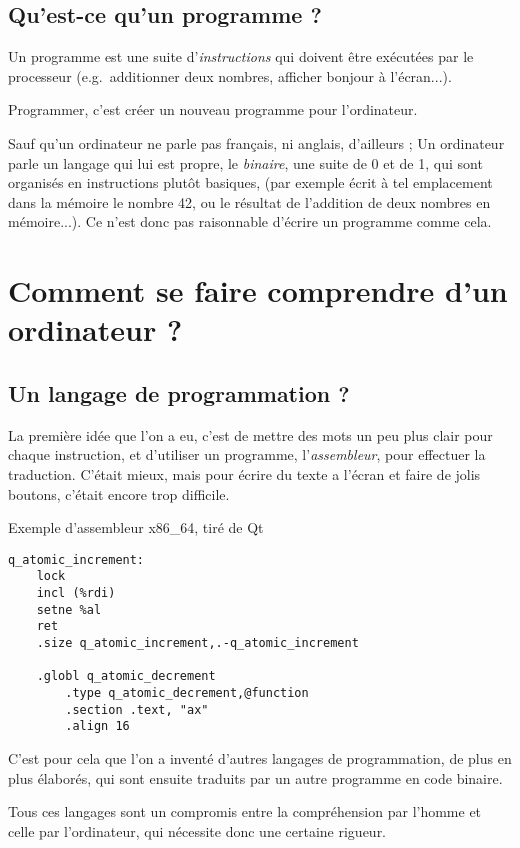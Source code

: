 \subsection{Qu'est-ce qu'un programme ?}
Un programme est une suite d'\emph{instructions} qui doivent être exécutées par le processeur
(e.g.\ additionner deux nombres, afficher bonjour à l'écran...).

Programmer, c'est créer un nouveau programme pour l'ordinateur.

Sauf qu'un ordinateur ne parle pas français, ni anglais, d'ailleurs ;
Un ordinateur parle un langage qui lui est propre,
le \emph{binaire}, une suite de 0 et de 1,
qui sont organisés en instructions plutôt basiques,
(par exemple écrit à tel emplacement dans la mémoire le
nombre 42, ou le résultat de l'addition de deux nombres en mémoire...).
Ce n'est donc pas raisonnable d'écrire un programme comme cela.
\section{Comment se faire comprendre d'un ordinateur ?}
\subsection{Un langage de programmation ?}
La première idée que l'on a eu,
c'est de mettre des mots un peu plus clair pour chaque instruction,
et d'utiliser un programme, l'\emph{assembleur}, pour effectuer la traduction.
C'était mieux, mais pour écrire du texte a l'écran et faire de jolis boutons,
c'était encore trop difficile.
\begin{listing}[h] %
\caption{Exemple d'assembleur x86\_64, tiré de Qt}
\begin{verbatim}
q_atomic_increment:
    lock
    incl (%rdi)
    setne %al
    ret
    .size q_atomic_increment,.-q_atomic_increment

    .globl q_atomic_decrement
        .type q_atomic_decrement,@function
        .section .text, "ax"
        .align 16
\end{verbatim}
\end{listing}

C'est pour cela que l'on a inventé d'autres langages de programmation,
de plus en plus élaborés,
qui sont ensuite traduits par un autre programme en code binaire.

Tous ces langages sont un compromis entre la compréhension par l'homme et celle par l'ordinateur, qui nécessite donc une certaine rigueur.

